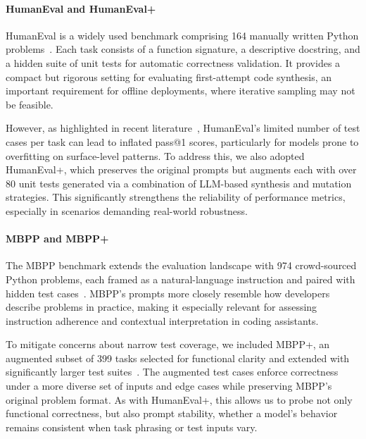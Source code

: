 \paragraph{HumanEval and HumanEval+}
HumanEval is a widely used benchmark comprising 164 manually written Python problems~\autocite{Chen2021}. Each task consists of a function signature, a descriptive docstring, and a hidden suite of unit tests for automatic correctness validation. It provides a compact but rigorous setting for evaluating first-attempt code synthesis, an important requirement for offline deployments, where iterative sampling may not be feasible.

However, as highlighted in recent literature~\autocite{Liu2023Rigorous}, HumanEval’s limited number of test cases per task can lead to inflated pass@1 scores, particularly for models prone to overfitting on surface-level patterns. To address this, we also adopted HumanEval+, which preserves the original prompts but augments each with over 80 unit tests generated via a combination of LLM-based synthesis and mutation strategies. This significantly strengthens the reliability of performance metrics, especially in scenarios demanding real-world robustness.

\paragraph{MBPP and MBPP+}
The \gls{MBPP} benchmark extends the evaluation landscape with 974 crowd-sourced Python problems, each framed as a natural-language instruction and paired with hidden test cases~\autocite{Austin2021}. MBPP’s prompts more closely resemble how developers describe problems in practice, making it especially relevant for assessing instruction adherence and contextual interpretation in coding assistants.

To mitigate concerns about narrow test coverage, we included MBPP+, an augmented subset of 399 tasks selected for functional clarity and extended with significantly larger test suites~\autocite{Liu2023Rigorous}. The augmented test cases enforce correctness under a more diverse set of inputs and edge cases while preserving MBPP’s original problem format. As with HumanEval+, this allows us to probe not only functional correctness, but also prompt stability, whether a model’s behavior remains consistent when task phrasing or test inputs vary.

